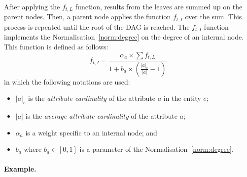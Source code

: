After applying the $f_{t,L}$ function, results from the leaves are summed up on the parent nodes. Then, a parent node applies the function $f_{t,I}$ over the sum. This process is repeated until the root of the DAG is reached. The $f_{t,I}$ function implements the Normalisation~\ref{norm:degree} on the degree of an internal node. This function is defined as follows:
\begin{equation}
\label{chap6:ranking:bm25mf_a}
f_{t,I} = \frac{\alpha_a \times \sum{f_{t,L}} }{ 1 + b_a \times \left(\frac{ \left|{a}\right|_e }{ \left|{a}\right| } - 1\right) }
\end{equation}
in which the following notations are used:
\begin{itemize}
\item $\left|{a}\right|_e$ is the \emph{attribute cardinality} of the attribute $a$ in the entity $e$;
\item $\left|{a}\right|$ is the \emph{average attribute cardinality} of the attribute $a$;
\item $\alpha_a$ is a weight specific to an internal node; and
\item $b_a$ where $b_a \in \left[0,1\right]$ is a parameter of the Normalisation~\ref{norm:degree}.
\end{itemize}

\paragraph{Example.}


